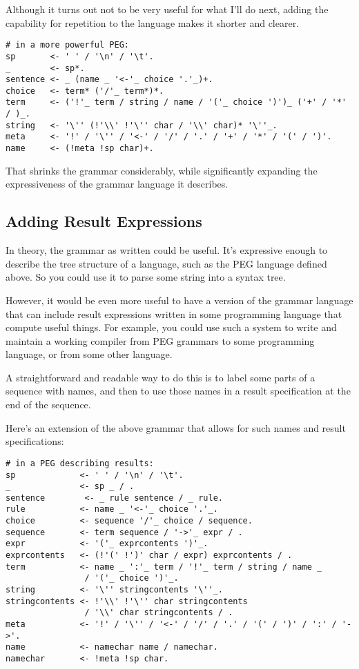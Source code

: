 \documentclass[
]{article}
\begin{document}
Although it turns out not to be very useful for what I'll do next,
adding the capability for repetition to the language makes it shorter
and clearer.

\begin{verbatim}
# in a more powerful PEG:
sp       <- ' ' / '\n' / '\t'.
_        <- sp*.
sentence <- _ (name _ '<-'_ choice '.'_)+.
choice   <- term* ('/'_ term*)*.
term     <- ('!'_ term / string / name / '('_ choice ')')_ ('+' / '*' / )_.
string   <- '\'' (!'\\' !'\'' char / '\\' char)* '\''_.
meta     <- '!' / '\'' / '<-' / '/' / '.' / '+' / '*' / '(' / ')'.
name     <- (!meta !sp char)+.
\end{verbatim}

That shrinks the grammar considerably, while significantly expanding the
expressiveness of the grammar language it describes.

\hypertarget{adding-result-expressions}{%
\subsection{Adding Result Expressions}\label{adding-result-expressions}}

In theory, the grammar as written could be useful. It's expressive
enough to describe the tree structure of a language, such as the PEG
language defined above. So you could use it to parse some string into a
syntax tree.

However, it would be even more useful to have a version of the grammar
language that can include result expressions written in some programming
language that compute useful things. For example, you could use such a
system to write and maintain a working compiler from PEG grammars to
some programming language, or from some other language.

A straightforward and readable way to do this is to label some parts of
a sequence with names, and then to use those names in a result
specification at the end of the sequence.

Here's an extension of the above grammar that allows for such names and
result specifications:

\begin{verbatim}
# in a PEG describing results:
sp             <- ' ' / '\n' / '\t'.
_              <- sp _ / .
sentence        <- _ rule sentence / _ rule.
rule           <- name _ '<-'_ choice '.'_.
choice         <- sequence '/'_ choice / sequence.
sequence       <- term sequence / '->'_ expr / .
expr           <- '('_ exprcontents ')'_.
exprcontents   <- (!'(' !')' char / expr) exprcontents / .
term           <- name _ ':'_ term / '!'_ term / string / name _ 
                / '('_ choice ')'_.
string         <- '\'' stringcontents '\''_.
stringcontents <- !'\\' !'\'' char stringcontents 
                / '\\' char stringcontents / .
meta           <- '!' / '\'' / '<-' / '/' / '.' / '(' / ')' / ':' / '->'.
name           <- namechar name / namechar.
namechar       <- !meta !sp char.
\end{verbatim}
\end{document}
